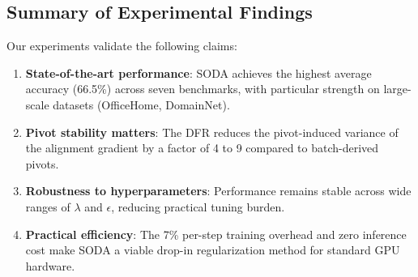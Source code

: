 \subsection{Summary of Experimental Findings}

Our experiments validate the following claims:

\begin{enumerate}
    \item \textbf{State-of-the-art performance}: SODA achieves the highest average accuracy (66.5\%) across seven benchmarks, with particular strength on large-scale datasets (OfficeHome, DomainNet).
    
    \item \textbf{Pivot stability matters}: The DFR reduces the pivot-induced variance of the alignment gradient by a factor of 4 to 9 compared to batch-derived pivots.
    
    \item \textbf{Robustness to hyperparameters}: Performance remains stable across wide ranges of $\lambda$ and $\epsilon$, reducing practical tuning burden.
    
    
    \item \textbf{Practical efficiency}: The 7\% per-step training overhead and zero inference cost make SODA a viable drop-in regularization method for standard GPU hardware.
\end{enumerate}